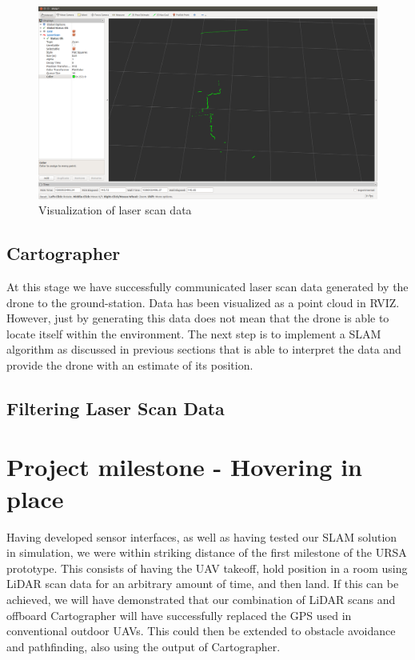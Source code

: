 \documentclass[capstone_report.tex]{subfiles}
\begin{document}
\begin{figure}[H]
    \centering
    \includegraphics[width=0.8\linewidth]{imgs/laser_scan_rviz.png}
    \caption{Visualization of laser scan data}
    \label{fig:RVIZ_laser}
\end{figure}

\subsection{Cartographer}
At this stage we have successfully communicated laser scan data generated by the drone to the ground-station.  Data has been visualized as a point cloud in RVIZ.  However, just by generating this data does not mean that the drone is able to locate itself within the environment.  The next step is to implement a SLAM algorithm as discussed in previous sections that is able to interpret the data and provide the drone with an estimate of its position.

\subsection{Filtering Laser Scan Data}


\section{Project milestone - Hovering in place}
Having developed sensor interfaces, as well as having tested our SLAM solution in simulation, we were within striking distance of the first milestone of the URSA prototype. This consists of having the UAV takeoff, hold position in a room using LiDAR scan data for an arbitrary amount of time, and then land. If this can be achieved, we will have demonstrated that our combination of LiDAR scans and offboard Cartographer will have successfully replaced the GPS used in conventional outdoor UAVs. This could then be extended to obstacle avoidance and pathfinding, also using the output of Cartographer.\\
\end{document}

